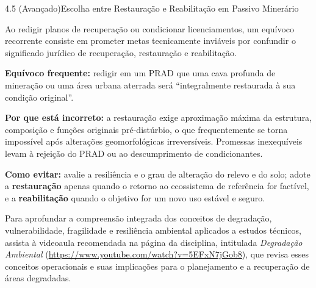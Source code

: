 \begin{boxExemplo}{4.5 (Avançado)}{Escolha entre Restauração e Reabilitação em Passivo Minerário}
\end{boxExemplo}


Ao redigir planos de recuperação ou condicionar licenciamentos, um equívoco recorrente consiste em prometer metas tecnicamente inviáveis por confundir o significado jurídico de recuperação, restauração e reabilitação.

\begin{boxErro}
\textbf{Equívoco frequente:} redigir em um PRAD que uma cava profunda de mineração ou uma área urbana aterrada será ``integralmente restaurada à sua condição original''.

\textbf{Por que está incorreto:} a restauração exige aproximação máxima da estrutura, composição e funções originais pré-distúrbio, o que frequentemente se torna impossível após alterações geomorfológicas irreversíveis. Promessas inexequíveis levam à rejeição do PRAD ou ao descumprimento de condicionantes.

\textbf{Como evitar:} avalie a resiliência e o grau de alteração do relevo e do solo; adote a \textbf{restauração} apenas quando o retorno ao ecossistema de referência for factível, e a \textbf{reabilitação} quando o objetivo for um novo uso estável e seguro.
\end{boxErro}

Para aprofundar a compreensão integrada dos conceitos de degradação, vulnerabilidade, fragilidade e resiliência ambiental aplicados a estudos técnicos, assista à videoaula recomendada na página da disciplina, intitulada \textit{Degradação Ambiental} (\url{https://www.youtube.com/watch?v=5EFxN7jGob8}), que revisa esses conceitos operacionais e suas implicações para o planejamento e a recuperação de áreas degradadas.

